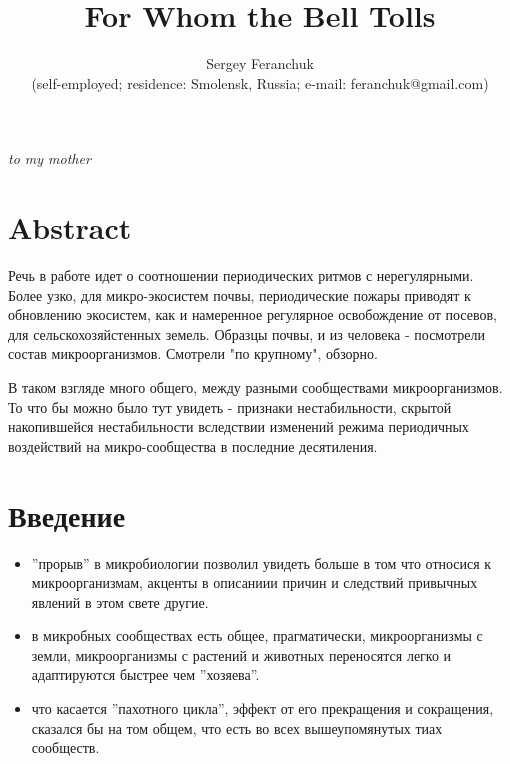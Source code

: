 \documentclass[a4paper]{article}
\begin{document}
\title{For Whom the Bell Tolls}

\author{Sergey Feranchuk \\{\small(self-employed; residence: Smolensk, Russia; e-mail: feranchuk@gmail.com)}}

\maketitle

\begin{flushright}
{\small \textit{to my mother}}
\end{flushright}

\section{Abstract}

Речь в работе идет о соотношении периодических ритмов с нерегулярными. Более узко, для микро-экосистем почвы, периодические пожары приводят к обновлению экосистем, как и намеренное регулярное освобождение от посевов, для  сельскохозяйстенных земель. Образцы почвы, и из человека - посмотрели состав микроорганизмов. Смотрели "по крупному", обзорно.

В таком взгляде много общего, между разными сообществами микроорганизмов. То что бы можно было тут увидеть - признаки нестабильности, скрытой накопившейся нестабильности вследствии изменений режима периодичных воздействий на микро-сообщества в последние десятиления.


\par

\section{Введение}

\begin{itemize}

\item ''прорыв'' в микробиологии позволил увидеть больше в том что относися к микроорганизмам, акценты в описаниии причин и следствий привычных явлений в этом свете другие.

\item в микробных сообществах есть общее, прагматически, микроорганизмы с земли, микроорганизмы с растений и животных переносятся легко и адаптируются быстрее чем ''хозяева''.

\item что касается ''пахотного цикла'', эффект от его прекращения и сокращения, сказался бы на том общем, что есть во всех вышеупомянутых тиах сообществ.



\end{itemize}
\end{document}
